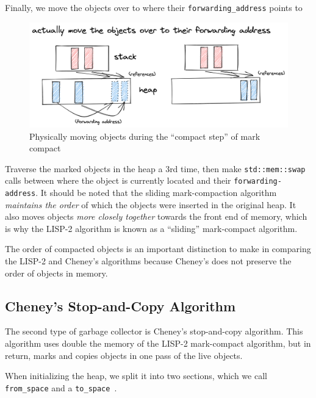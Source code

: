 \documentclass[index]{subfiles}
\begin{document}
Finally, we move the objects over to where their \verb+forwarding_address+ points to

\begin{figure}[H]
    \centering
    \includegraphics[scale=0.14]{pics/actually-move.png}
    \caption{Physically moving objects during the ``compact step'' of mark compact}
\end{figure}

Traverse the marked objects in the heap a 3rd time, then make \texttt{std::mem::swap} calls between where the object is currently located and their \verb+forwarding-address+. It should be noted that the sliding mark-compaction algorithm \textit{maintains the order} of which the objects were inserted in the original heap. It also moves objects \textit{more closely together} towards the front end of memory, which is why the LISP-2 algorithm is known as a ``sliding'' mark-compact algorithm.

The order of compacted objects is an important distinction to make in comparing the LISP-2 and Cheney's algorithms because Cheney's does not preserve the order of objects in memory.

\subsection{Cheney's Stop-and-Copy Algorithm}

The second type of garbage collector is Cheney's stop-and-copy algorithm. This algorithm uses double the memory of the LISP-2 mark-compact algorithm, but in return, marks and copies objects in one pass of the live objects.

When initializing the heap, we split it into two sections, which we call \verb+from_space+ and a \verb+to_space+~\parencite[Chapter~2]{gc_handbook}.
\end{document}
